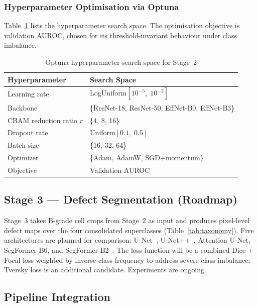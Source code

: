 \documentclass[conference]{IEEEtran}
\begin{document}
\subsubsection{Hyperparameter Optimisation via Optuna}

Table~\ref{tab:optuna} lists the hyperparameter search space.
The optimisation objective is validation AUROC, chosen for its
threshold-invariant behaviour under class imbalance.

\begin{table}[t]
  \caption{Optuna hyperparameter search space for Stage~2}
  \label{tab:optuna}
  \begin{center}
  \renewcommand{\arraystretch}{1.1}
  \begin{tabular}{ll}
    \toprule
    \textbf{Hyperparameter} & \textbf{Search Space} \\
    \midrule
    Learning rate & LogUniform$[10^{-5},\;10^{-2}]$ \\
    Backbone & \{ResNet-18, ResNet-50, EffNet-B0, EffNet-B3\} \\
    CBAM reduction ratio $r$ & \{4, 8, 16\} \\
    Dropout rate & Uniform$[0.1,\;0.5]$ \\
    Batch size & \{16, 32, 64\} \\
    Optimizer & \{Adam, AdamW, SGD+momentum\} \\
    Objective & Validation AUROC \\
    \bottomrule
  \end{tabular}
  \end{center}
\end{table}

\subsection{Stage 3 --- Defect Segmentation (Roadmap)}
\label{sec:stage3}

Stage~3 takes B-grade cell crops from Stage~2 as input and
produces pixel-level defect maps over the four consolidated
superclasses (Table~\ref{tab:taxonomy}).
Five architectures are planned for comparison:
U-Net~\cite{ronneberger2015}, U-Net++~\cite{zhou2018},
Attention U-Net, SegFormer-B0, and
SegFormer-B2~\cite{xie2021}.
The loss function will be a combined Dice + Focal loss weighted
by inverse class frequency to address severe class imbalance;
Tversky loss is an additional candidate.
Experiments are ongoing.

\subsection{Pipeline Integration}
\end{document}
